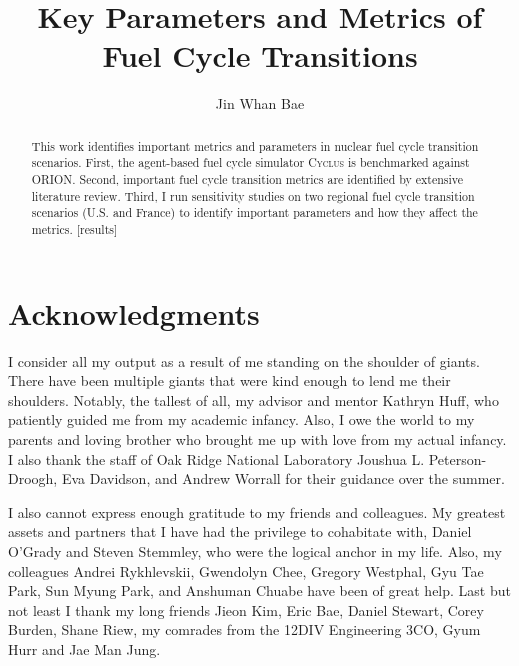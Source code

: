 \documentclass{report}
\newcommand{\Cyclus}{\textsc{Cyclus}\xspace}%
\begin{document}
\title{Key Parameters and Metrics of Fuel Cycle Transitions}
\author{Jin Whan Bae}
\maketitle


\begin{abstract}
This work identifies important metrics and parameters in
nuclear fuel cycle transition scenarios. First, the agent-based
fuel cycle simulator \Cyclus is benchmarked against \gls{ORION}.
Second, important fuel cycle transition metrics are identified
by extensive literature review.
Third, I run sensitivity studies on two regional fuel cycle
transition scenarios (U.S. and France) to identify important
parameters and how they affect the metrics.
[results]

\end{abstract}

\chapter*{Acknowledgments}

I consider all my output as a result of me standing on the shoulder
of giants. There have been multiple giants that were kind enough
to lend me their shoulders. Notably, the tallest of all, my advisor
and mentor Kathryn Huff, who patiently guided me from my academic
infancy. Also, I owe the world to my parents and loving brother who
brought me up with love
from my actual infancy.  I also thank the staff of Oak Ridge National Laboratory
Joushua L. Peterson-Droogh, Eva Davidson, and Andrew Worrall for their
guidance over the summer.

I also cannot express enough gratitude to my friends and colleagues. My greatest
assets and partners that I have had the privilege to cohabitate with, Daniel
O'Grady and Steven Stemmley, who were the logical anchor in my life. Also, my colleagues
Andrei Rykhlevskii, Gwendolyn Chee, Gregory Westphal, Gyu Tae Park, Sun Myung Park, and
Anshuman Chuabe have been of great help. Last but not least I thank my long friends Jieon Kim,
Eric Bae, Daniel Stewart, Corey Burden, Shane Riew, my comrades from the 12DIV Engineering 3CO, Gyum Hurr and Jae Man Jung.
\end{document}

